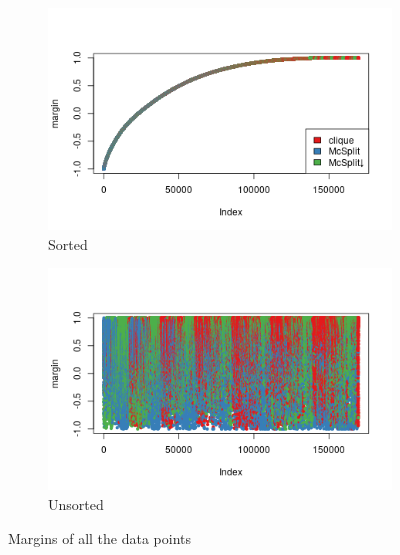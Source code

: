 \documentclass{l4proj}
\theoremstyle{definition}
\theoremstyle{remark}
\begin{document}
\begin{figure}
  \centering
  \begin{subfigure}[t]{0.49\textwidth}
    \centering
    \includegraphics[width=\textwidth]{images/both_labels_margin.png}
    \caption{Sorted}
  \end{subfigure}
  \begin{subfigure}[t]{0.49\textwidth}
    \centering
    \includegraphics[width=\textwidth]{images/both_labels_margin2.png}
    \caption{Unsorted}
  \end{subfigure}
  \caption{Margins of all the data points}
  \label{fig:both_labels_margins}
\end{figure}
\end{document}

